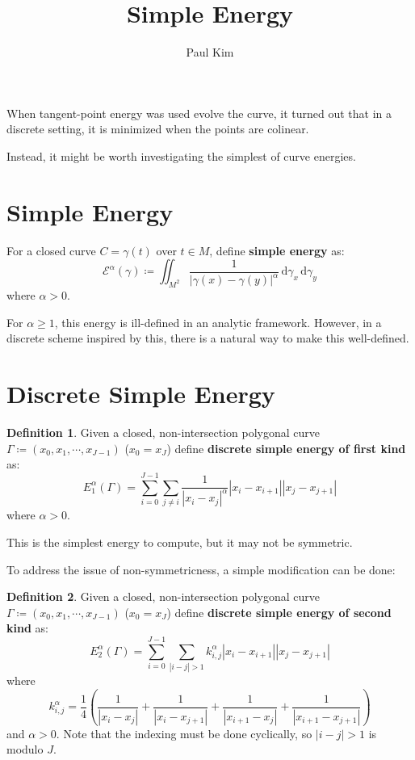 \documentclass[a4paper]{article}
\title{Simple Energy}
\author{Paul Kim}
\newcommand{\dgamma}{\, \text{d}\gamma}
\theoremstyle{definition}
\newtheorem{definition}{Definition}
\begin{document}
\maketitle
When tangent-point energy was used evolve the curve, it turned out that in a discrete setting,
it is minimized when the points are colinear.

Instead, it might be worth investigating the simplest of curve energies.
\section{Simple Energy}
For a closed curve $C = \gamma(t)$ over $t \in M$, define \textbf{simple energy} as:
\begin{equation}
    \mathcal{E}^{\alpha} \left( \gamma \right) \coloneqq \iint_{M^2} \frac{1}{|\gamma(x) - \gamma(y)|^{\alpha}} \dgamma_x \dgamma_y
\end{equation}
where $\alpha > 0$.

For $\alpha \geq 1$, this energy is ill-defined in an analytic framework.
However, in a discrete scheme inspired by this, there is a natural way to make this well-defined.

\section{Discrete Simple Energy}
\begin{definition}
    Given a closed, non-intersection polygonal curve $\Gamma \coloneqq \left( x_0, x_1, \cdots, x_{J-1} \right)$
    ($x_0 = x_J$)
    define \textbf{discrete simple energy of first kind} as:
    \begin{equation}
        E_{1}^{\alpha}\left( \Gamma \right) = \sum_{i=0}^{J-1} \sum_{j \neq i} \frac{1}{|x_i -x_j|^{\alpha}} |x_i - x_{i+1}| |x_j - x_{j+1}|
    \end{equation}
    where $\alpha > 0$.
\end{definition}

This is the simplest energy to compute, but it may not be symmetric.

To address the issue of non-symmetricness, a simple modification can be done:
\begin{definition}
    Given a closed, non-intersection polygonal curve $\Gamma \coloneqq \left( x_0, x_1, \cdots, x_{J-1} \right)$
    ($x_0 = x_J$)
    define \textbf{discrete simple energy of second kind} as:
    \begin{equation}
        E_{2}^{\alpha}\left( \Gamma \right) = \sum_{i=0}^{J-1} \sum_{|i - j| > 1} k_{i,j}^{\alpha} |x_i - x_{i+1}| |x_j - x_{j+1}|
    \end{equation}
    where
    \begin{equation}
        k_{i,j}^{\alpha} = \frac{1}{4} \left( \frac{1}{|x_i - x_j|} + \frac{1}{|x_{i} - x_{j+1}|} + \frac{1}{|x_{i+1} - x_{j}|} + \frac{1}{|x_{i+1} - x_{j+1}|} \right)
    \end{equation}
    and $\alpha > 0$.
    Note that the indexing must be done cyclically, so $|i-j| > 1$ is modulo $J$.
\end{definition}
\end{document}
